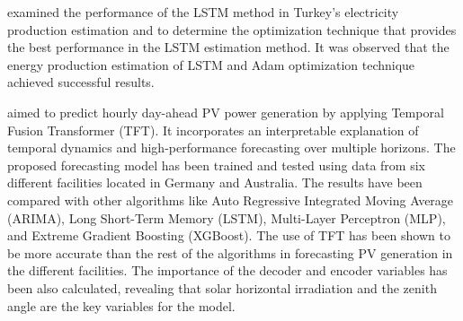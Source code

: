 \cite{9848724} examined the performance of the LSTM method in Turkey's electricity production estimation and to determine the optimization technique that provides the best performance in the LSTM estimation method.
It was observed that the energy production estimation of LSTM and Adam optimization technique achieved successful results.

\cite{en15145232} aimed to predict hourly day-ahead PV power generation by applying Temporal Fusion Transformer (TFT).
It incorporates an interpretable explanation of temporal dynamics and high-performance forecasting over multiple horizons.
The proposed forecasting model has been trained and tested using data from six different facilities located in Germany and Australia.
The results have been compared with other algorithms like Auto Regressive Integrated Moving Average (ARIMA), Long Short-Term Memory (LSTM), Multi-Layer Perceptron (MLP), and Extreme Gradient Boosting (XGBoost).
The use of TFT has been shown to be more accurate than the rest of the algorithms in forecasting PV generation in the different facilities.
The importance of the decoder and encoder variables has been also calculated, revealing that solar horizontal irradiation and the zenith angle are the key variables for the model.

